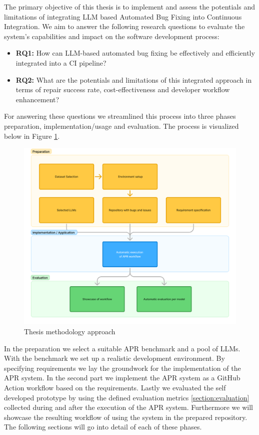 The primary objective of this thesis is to implement and assess the potentials and limitations of integrating LLM based Automated Bug Fixing into Continuous Integration. We aim to answer the following research questions to evaluate the system's capabilities and impact on the software development process:

\begin{itemize}
    \item \textbf{RQ1:} How can LLM-based automated bug fixing be effectively and efficiently integrated into a CI pipeline?
    \item \textbf{RQ2:} What are the potentials and limitations of this integrated approach in terms of repair success rate, cost-effectiveness and developer workflow enhancement?
\end{itemize}

For answering these questions we streamlined this process into three phases preparation, implementation/usage and evaluation. The process is visualized below in Figure \ref{fig:method-overview}.

\begin{figure}[H]
    \centering
    \includegraphics[width=1\textwidth]{images/flowcharts/method.png}
    \caption{Thesis methodology approach}
    \label{fig:method-overview}
\end{figure}

In the preparation we select a suitable APR benchmark and a pool of LLMs. With the benchmark we set up a realistic development environment. By specifying requirements we lay the groundwork for the implementation of the APR system.
In the second part we implement the APR system as a GitHub Action workflow based on the requirements.
Lastly we evaluated the self developed prototype by using the defined evaluation metrics \ref{section:evaluation} collected during and after the execution of the APR system. Furthermore we will showcase the resulting workflow of using the system in the prepared repository.
The following sections will go into detail of each of these phases.

